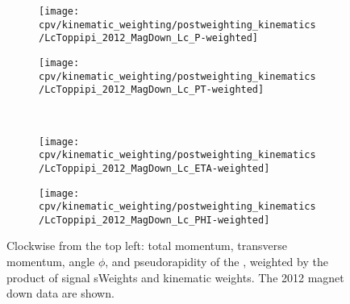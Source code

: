 \begin{figure}
  \begin{subfigure}[b]{0.4\textwidth}
    \texttt{[image: cpv/kinematic\_weighting/postweighting\_kinematics/LcToppipi\_2012\_MagDown\_Lc\_P-weighted]}
    \label{fig:cpv:kinematic_weighting:post:Lc:P}
  \end{subfigure}
  \begin{subfigure}[b]{0.4\textwidth}
    \texttt{[image: cpv/kinematic\_weighting/postweighting\_kinematics/LcToppipi\_2012\_MagDown\_Lc\_PT-weighted]}
    \label{fig:cpv:kinematic_weighting:post:Lc:PT}
  \end{subfigure}\\
  \begin{subfigure}[b]{0.4\textwidth}
    \texttt{[image: cpv/kinematic\_weighting/postweighting\_kinematics/LcToppipi\_2012\_MagDown\_Lc\_ETA-weighted]}
    \label{fig:cpv:kinematic_weighting:post:Lc:ETA}
  \end{subfigure}
  \begin{subfigure}[b]{0.4\textwidth}
    \texttt{[image: cpv/kinematic\_weighting/postweighting\_kinematics/LcToppipi\_2012\_MagDown\_Lc\_PHI-weighted]}
    \label{fig:cpv:kinematic_weighting:post:Lc:PHI}
  \end{subfigure}
  \caption{%
    Clockwise from the top left: total momentum, transverse momentum, angle 
    $\phi$, and pseudorapidity of the \PLambdac, weighted by the product of 
    signal sWeights and kinematic weights.
    The 2012 magnet down data are shown.
  }
  \label{fig:cpv:kinematic_weighting:post:Lc}
\end{figure}

